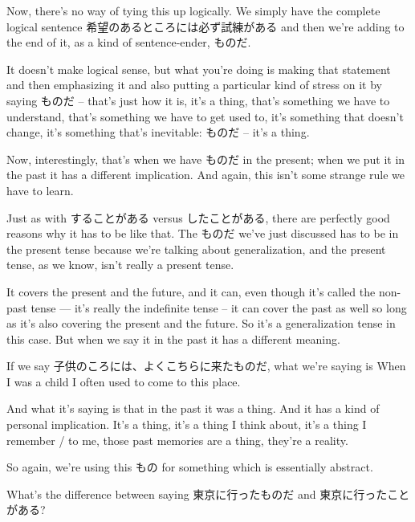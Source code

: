 Now, there's no way of tying this up logically. We simply have the complete logical sentence 希望のあるところには必ず試練がある and then we're adding to the end of it, as a kind of sentence-ender, ものだ.

{}

It doesn't make logical sense, but what you're doing is making that statement and then emphasizing it and also putting a particular kind of stress on it by saying ものだ -- that's just how it is, it's a thing, that's something we have to understand, that's something we have to get used to, it's something that doesn't change, it's something that's inevitable: ものだ -- it's a thing.

Now, interestingly, that's when we have ものだ in the present; when we put it in the past it has a different implication. And again, this isn't some strange rule we have to learn.

{}Just as with することがある versus したことがある, there are perfectly good reasons why it has to be like that. The ものだ we've just discussed has to be in the present tense because we're talking about generalization, and the present tense, as we know, isn't really a present tense.

It covers the present and the future, and it can, even though it's called the non-past tense{} --- it's really the indefinite tense -- it can cover the past as well so long as it's also covering the present and the future. So it's a generalization tense in this case. But when we say it in the past it has a different meaning.

If we say 子供のころには、よくこちらに来たものだ, what we're saying is When I was a child I often used to come to this place.

\startsectionlevel[title={ものだ here is referring to something in the past.},reference={ものだ-here-is-referring-to-something-in-the-past.}]

And what it's saying is that in the past it was a thing. And it has a kind of personal implication. It's a thing, it's a thing I think about, it's a thing I remember / to me, those past memories are a thing, they're a reality.

So again, we're using this もの for something which is essentially abstract.

What's the difference between saying 東京に行ったものだ and 東京に行ったことがある?

